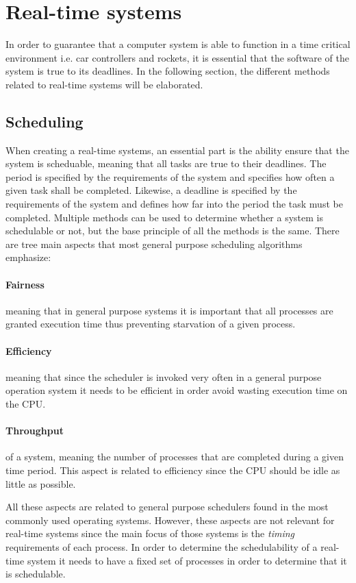 \section{Real-time systems}\label{Theory:RTS}
In order to guarantee that a computer system is able to function in a time critical environment i.e. car controllers and rockets, it is essential that the software of the system is true to its deadlines. 
In the following section, the different methods related to real-time systems will be elaborated.

\subsection{Scheduling}
When creating a real-time systems, an essential part is the ability ensure that the system is scheduable, meaning that all tasks are true to their deadlines. 
The period is specified by the requirements of the system and specifies how often a given task shall be completed.
Likewise, a deadline is specified by the requirements of the system and defines how far into the period the task must be completed.
Multiple methods can be used to determine whether a system is schedulable or not, but the base principle of all the methods is the same. 
There are tree main aspects that most general purpose scheduling algorithms emphasize:
\paragraph{Fairness} meaning that in general purpose systems it is important that all processes are granted execution time thus preventing starvation of a given process. 
\paragraph{Efficiency} meaning that since the scheduler is invoked very often in a general purpose operation system it needs to be efficient in order avoid wasting execution time on the CPU. 
\paragraph{Throughput} of a system, meaning the number of processes that are completed during a given time period.
This aspect is related to efficiency since the CPU should be idle as little as possible. 

All these aspects are related to general purpose schedulers found in the most commonly used operating systems. 
However, these aspects are not relevant for real-time systems since the main focus of those systems is the \textit{timing} requirements of each process.
In order to determine the schedulability of a real-time system it needs to have a fixed set of processes in order to determine that it is schedulable.

